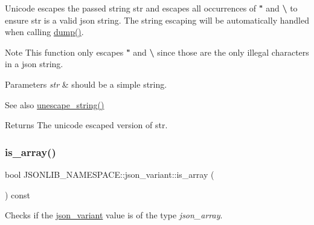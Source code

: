 Unicode escapes the passed string {\ttfamily str} and escapes all occurrences of {\bfseries "} and {\bfseries \textbackslash{}} to ensure {\ttfamily str} is a valid json string. The string escaping will be automatically handled when calling \hyperlink{classJSONLIB__NAMESPACE_1_1json__variant_a72d4a39d77b76f076354219edc6ea4a0}{dump()}. 

\begin{DoxyNote}{Note}
This function only escapes {\bfseries "} and {\bfseries \textbackslash{}} since those are the only illegal characters in a json string. 
\end{DoxyNote}

\begin{DoxyParams}{Parameters}
{\em str} & should be a simple string. \\
\hline
\end{DoxyParams}
\begin{DoxySeeAlso}{See also}
\hyperlink{classJSONLIB__NAMESPACE_1_1json__variant_ab3b411443074a97949b5675676d0b136}{unescape\+\_\+string()} 
\end{DoxySeeAlso}
\begin{DoxyReturn}{Returns}
The unicode escaped version of {\ttfamily str}. 
\end{DoxyReturn}
\mbox{\label{classJSONLIB__NAMESPACE_1_1json__variant_a72349dff71a411ac24eea6d943772df7}} 
\subsubsection{\texorpdfstring{is\+\_\+array()}{is\_array()}}
{\footnotesize\ttfamily bool J\+S\+O\+N\+L\+I\+B\+\_\+\+N\+A\+M\+E\+S\+P\+A\+C\+E\+::json\+\_\+variant\+::is\+\_\+array (\begin{DoxyParamCaption}{ }\end{DoxyParamCaption}) const}



Checks if the \hyperlink{classJSONLIB__NAMESPACE_1_1json__variant}{json\+\_\+variant} value is of the type {\itshape json\+\_\+array}. 

